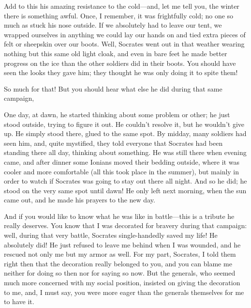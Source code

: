 Add to this his amazing resistance to the cold---and, let me tell you,
the  winter there is something awful. Once, I remember, it was
frightfully cold; no one so much as stuck his nose outside. If we
absolutely had to leave our tent, we wrapped ourselves in anything we
could lay our hands on and tied extra pieces of felt or sheepskin over
our boots. Well, Socrates went out in that weather wearing nothing but
this same old light cloak, and even in bare feet he made better progress
on the ice than the other  soldiers did in their boots. You
should have seen the looks they gave him; they thought he was only doing
it to spite them!

So much for that! But you should hear what else he did during that same
campaign,

\blank[line]


\blank[line]

One day, at dawn, he started thinking about some problem or other; he
just stood outside, trying to figure it out. He couldn't resolve it, but
he wouldn't give up. He simply stood there, glued to the same spot. By
midday, many soldiers had seen him, and, quite mystified, they told
everyone that Socrates had been standing there all day, thinking about
something. He was still there when evening came, and after dinner some
Ionians  moved their bedding outside, where it was cooler and
more comfortable (all this took place in the summer), but mainly in
order to watch if Socrates was going to stay out there all night. And so
he did; he stood on the very same spot until dawn! He only left next
morning, when the sun came out, and he made his prayers to the new day.

And if you would like to know what he was like in battle---this is a
tribute he really deserves. You know that I was decorated for bravery
during  that campaign: well, during that very battle, Socrates
single-handedly saved my life! He absolutely did! He just refused to
leave me behind when I was wounded, and he rescued not only me but my
armor as well. For my part, Socrates, I told them right then that the
decoration really belonged to you, and you can blame me neither for
doing so then nor for saying so now. But the generals, who seemed much
more concerned with my social position, insisted on giving the
decoration to me, and, I must say, you were more eager than the generals
themselves for me to have it.

